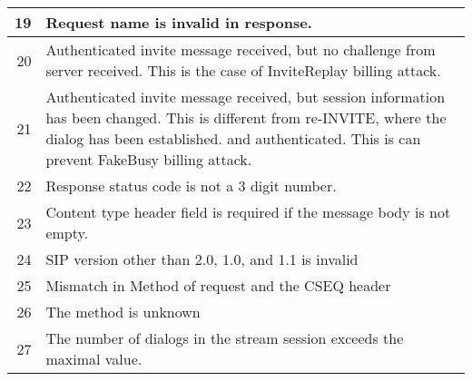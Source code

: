 \documentclass[english]{report}
\begin{document}
\begin{longtable}{|r|p{13.5cm}|}
\hline
 19 & Request name is invalid in response.\\
\hline
 20 & Authenticated invite message received, but no challenge from server received. 
      This is the case of InviteReplay billing attack.\\
\hline
 21 & Authenticated invite message received, but session information has been changed. 
      This is different from re-INVITE, where the dialog has been established.
      and authenticated. This is can prevent FakeBusy billing attack.\\
\hline
 22 &  Response status code is not a 3 digit number.\\
\hline
 23 &  Content type header field is required if the message body is not empty.\\
\hline
 24 &  SIP version other than 2.0, 1.0, and 1.1 is invalid \\
\hline
 25 &  Mismatch in Method of request and the CSEQ header\\
\hline
 26 &  The method is unknown \\
\hline
 27 &  The number of dialogs in the stream session exceeds the maximal value. \\
\hline
\end{longtable}
\end{document}
